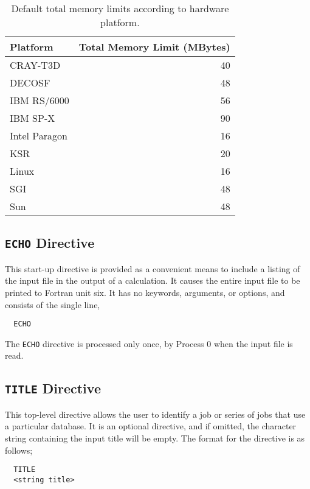 \begin{table}
\caption{Default total memory limits according to hardware platform.}
\label{tbl:default-memory-limits}
\begin{tabular}{lr}
\hline\hline
Platform        & Total Memory Limit (MBytes) \\
\hline
CRAY-T3D        & 40 \\
DECOSF          & 48 \\
IBM RS/6000     & 56 \\
IBM SP-X        & 90 \\
Intel Paragon   & 16 \\
KSR             & 20 \\
Linux           & 16 \\
SGI             & 48 \\
Sun             & 48 \\
\hline\hline
\end{tabular}
\end{table}

\subsection{{\tt ECHO} Directive}
\label{sec:echo}

This start-up directive is provided as a convenient means to include a
listing of the input file in the output of a calculation.  It causes
the entire input file to be printed to Fortran unit six.  It has no
keywords, arguments, or options, and consists of the single line,

\begin{verbatim}
  ECHO
\end{verbatim}

The \verb+ECHO+ directive is processed only
once, by Process 0 when the input file is read.

\subsection{{\tt TITLE} Directive}

This top-level directive allows the user to identify a job or series of 
jobs that use a
particular database.  It is an optional directive, and if omitted, the 
character string containing the input title will be empty.  The format for 
the directive is as follows;

\begin{verbatim}
  TITLE 
  <string title>
\end{verbatim}

